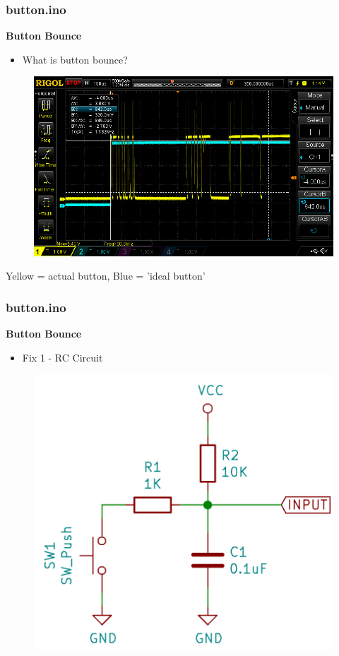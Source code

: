 \documentclass[t]{beamer}
\begin{document}
\begin{frame}[t]
\frametitle{button.ino}
\textbf{Button Bounce}
\begin{itemize}
	\item What is button bounce?
\end{itemize}
\begin{figure}
	\includegraphics[scale=0.3]{bouncingBegin.png}
\end{figure}
\centering
Yellow = actual button, Blue = 'ideal button'

\end{frame}


\begin{frame}[t]
\frametitle{button.ino}
\textbf{Button Bounce}
\begin{itemize}
	\item Fix 1 - RC Circuit
\end{itemize}
\begin{figure}
	\includegraphics[scale=0.3]{RCswitch.png}
\end{figure}
\end{frame}
\end{document}

